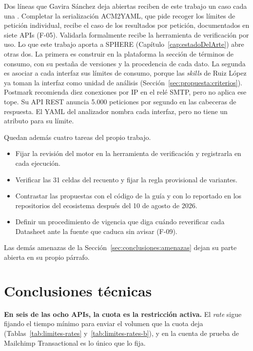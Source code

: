 Dos líneas que Gavira Sánchez deja abiertas reciben de este trabajo un caso cada una \citep{gavira2026tfm}.
Completar la serialización ACM2YAML, que pide recoger los límites de petición individual, recibe el caso de los resultados por petición, documentados en siete APIs (F-05).
Validarla formalmente recibe la herramienta de verificación por uso.
Lo que este trabajo aporta a SPHERE (Capítulo~\ref{cap:estadoDelArte}) abre otras dos.
La primera es construir en la plataforma la sección de términos de consumo, con su pestaña de versiones y la procedencia de cada dato.
La segunda es asociar a cada interfaz sus límites de consumo, porque las \textit{skills} de Ruiz López ya toman la interfaz como unidad de análisis (Sección~\ref{sec:propuesta:criterios}).
Postmark recomienda diez conexiones por IP en el relé SMTP, pero no aplica ese tope.
Su API REST anuncia 5.000 peticiones por segundo en las cabeceras de respuesta.
El YAML del analizador nombra cada interfaz, pero no tiene un atributo para su límite.

Quedan además cuatro tareas del propio trabajo.

\begin{itemize}
\item Fijar la revisión del motor en la herramienta de verificación y registrarla en cada ejecución.
\item Verificar las 31 celdas del recuento y fijar la regla provisional de variantes.
\item Contrastar las propuestas con el código de la guía y con lo reportado en los repositorios del ecosistema después del 10 de agosto de 2026.
\item Definir un procedimiento de vigencia que diga cuándo reverificar cada Datasheet ante la fuente que caduca sin avisar (F-09).
\end{itemize}

Las demás amenazas de la Sección~\ref{sec:conclusiones:amenazas} dejan su parte abierta en su propio párrafo.

\section{Conclusiones técnicas}\label{sec:conclusiones:cierre}

\textbf{En seis de las ocho APIs, la cuota es la restricción activa.} El \textit{rate} sigue fijando el tiempo mínimo para enviar el volumen que la cuota deja (Tablas~\ref{tab:limites-rates} y~\ref{tab:limites-rates-b}), y en la cuenta de prueba de Mailchimp Transactional es lo único que lo fija.

